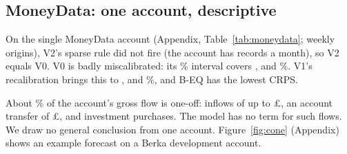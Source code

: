\subsection{MoneyData: one account, descriptive}
On the single MoneyData account (Appendix, Table~\ref{tab:moneydata};
 weekly origins), V2's sparse rule did not fire
(the account has  records a month), so V2
equals V0. V0 is badly miscalibrated: its \lC\% interval covers
,  and
\%. V1's recalibration brings this to
,  and
\%, and B-EQ has the lowest CRPS.

About \% of the account's gross flow is one-off:
inflows of up to \pounds{}, an account transfer of
\pounds{}, and investment purchases. The model has no term
for such flows. We draw no general conclusion from one account.
Figure~\ref{fig:cone} (Appendix) shows an example forecast on a Berka
development account.
